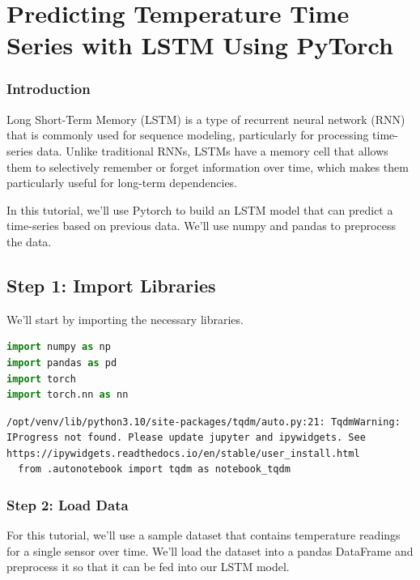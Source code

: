 \section{Predicting Temperature Time Series with LSTM Using
PyTorch}\label{predicting-temperature-time-series-with-lstm-using-pytorch}

\subsubsection{Introduction}\label{introduction}

Long Short-Term Memory (LSTM) is a type of recurrent neural network
(RNN) that is commonly used for sequence modeling, particularly for
processing time-series data. Unlike traditional RNNs, LSTMs have a
memory cell that allows them to selectively remember or forget
information over time, which makes them particularly useful for
long-term dependencies.

In this tutorial, we'll use Pytorch to build an LSTM model that can
predict a time-series based on previous data. We'll use numpy and pandas
to preprocess the data.

\subsection{Step 1: Import Libraries}\label{step-1-import-libraries}

We'll start by importing the necessary libraries.

\begin{lstlisting}[language=Python]
import numpy as np
import pandas as pd
import torch
import torch.nn as nn
\end{lstlisting}

\begin{lstlisting}
/opt/venv/lib/python3.10/site-packages/tqdm/auto.py:21: TqdmWarning: IProgress not found. Please update jupyter and ipywidgets. See https://ipywidgets.readthedocs.io/en/stable/user_install.html
  from .autonotebook import tqdm as notebook_tqdm
\end{lstlisting}

\subsubsection{Step 2: Load Data}\label{step-2-load-data}

For this tutorial, we'll use a sample dataset that contains temperature
readings for a single sensor over time. We'll load the dataset into a
pandas DataFrame and preprocess it so that it can be fed into our LSTM
model.

